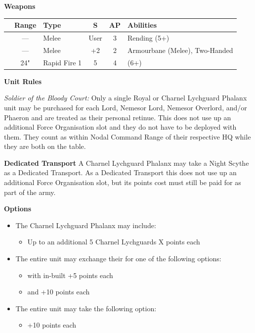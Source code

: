 \begin{minipage}[t]{0.72\textwidth}
	\vspace*{2em}
	\textbf{Weapons}
	
	\begin{tabular}{L{90 pt} c C{40pt} *{2}{c} >{\raggedright\arraybackslash}p{130pt}}
		& Range & Type & S & AP & Abilities \\
		\hline
		 & — & Melee & User & 3 & Rending (5+) \\
		 & — & Melee & +2 & 2 & Armourbane (Melee), Two-Handed \\
		 & 24" & Rapid Fire 1 & 5 & 4 &  (6+) \\
	\end{tabular}
	
	\vspace*{2em}
	\textbf{Unit Rules}
	
	\textit{Soldier of the Bloody Court:} Only a single Royal or Charnel Lychguard Phalanx unit may be purchased for each Lord, Nemesor Lord, Nemesor Overlord, and/or Phaeron and are treated as their personal retinue. This does not use up an additional Force Organisation slot and they do not have to be deployed with them. They count as within Nodal Command Range of their respective HQ while they are both on the table.
		
	\vspace*{2em}
	\textbf{Dedicated Transport}
	A Charnel Lychguard Phalanx may take a Night Scythe as a Dedicated Transport. As a Dedicated Transport this does not use up an additional Force Organisation slot, but its points cost must still be paid for as part of the army.
	
	\vspace*{2em}
	\textbf{Options}
	\begin{itemize}
		\item The Charnel Lychguard Phalanx may include:
		\begin{itemize}
			\item Up to an additional 5 Charnel Lychguards \dotfill X points each
		\end{itemize}
		\item The entire unit may exchange their  for one of the following options:
		\begin{itemize}
			\item {} with in-built  \dotfill +5 points each
			\item {} and  \dotfill +10 points each
		\end{itemize}
		\item The entire unit may take the following option:
		\begin{itemize}
			\item {} \dotfill +10 points each
		\end{itemize}
	\end{itemize}
\end{minipage}
